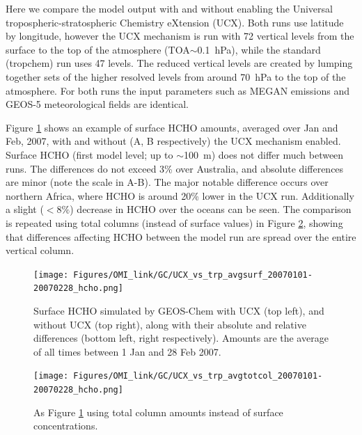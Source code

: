       Here we compare the model output with and without enabling the Universal tropospheric-stratospheric Chemistry eXtension (UCX).
      Both runs use \lowhr latitude by longitude, however the UCX mechanism is run with 72 vertical levels from the surface to the top of the atmosphere (TOA$\sim$0.1~hPa), while the standard (tropchem) run uses 47 levels.
      The reduced vertical levels are created by lumping together sets of the higher resolved levels from around 70~hPa to the top of the atmosphere.
      For both runs the input parameters such as MEGAN emissions and GEOS-5 meteorological fields are identical.
      
      Figure \ref{Model:GC:simulations:comparison:fig_UCXvsTrop_HCHO_surf_fullday} shows an example of surface HCHO amounts, averaged over Jan and Feb, 2007, with and without (A, B respectively) the UCX mechanism enabled.
      Surface HCHO (first model level; up to $\sim$100~m) does not differ much between runs.
      The differences do not exceed 3\% over Australia, and absolute differences are minor (note the scale in A-B).
      The major notable difference occurs over northern Africa, where HCHO is around 20\% lower in the UCX run.
      Additionally a slight ($<8\%$) decrease in HCHO over the oceans can be seen.
      The comparison is repeated using total columns (instead of surface values) in Figure \ref{Model:GC:simulations:comparison:fig_UCXvsTrop_HCHO_totcol_fullday}, showing that differences affecting HCHO between the model run are spread over the entire vertical column.
      
      \begin{figure}
        \texttt{[image: Figures/OMI\_link/GC/UCX\_vs\_trp\_avgsurf\_20070101-20070228\_hcho.png]}
        \caption{%
          Surface HCHO simulated by GEOS-Chem with UCX (top left), and without UCX (top right), along with their absolute and relative differences (bottom left, right respectively).
          Amounts are the average of all times between 1 Jan and 28 Feb 2007.
        }
        \label{Model:GC:simulations:comparison:fig_UCXvsTrop_HCHO_surf_fullday}
      \end{figure}
      
      \begin{figure}
        \texttt{[image: Figures/OMI\_link/GC/UCX\_vs\_trp\_avgtotcol\_20070101-20070228\_hcho.png]}
        \caption{%
          As Figure \ref{Model:GC:simulations:comparison:fig_UCXvsTrop_HCHO_surf_fullday} using total column amounts instead of surface concentrations.
        }
        \label{Model:GC:simulations:comparison:fig_UCXvsTrop_HCHO_totcol_fullday}
      \end{figure}
      

